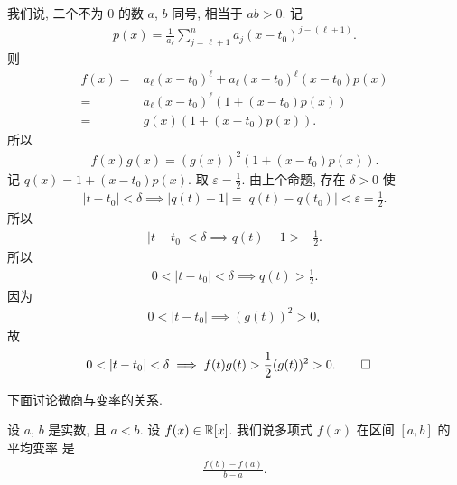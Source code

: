 \begin{pf}
    我们说, 二个不为 $0$ 的数 $a$, $b$ 同号, 相当于 $ab > 0$. 记
    \begin{align*}
        p(x) = \frac{1}{a_\ell} \sum_{j = \ell + 1}^{n} a_j (x - t_0)^{j - (\ell + 1)}.
    \end{align*}
    则
    \begin{align*}
        f(x)
        = {} & a_\ell (x - t_0)^\ell + a_\ell (x - t_0)^{\ell} (x - t_0) p(x) \\
        = {} & a_\ell (x - t_0)^\ell (1 + (x - t_0) p(x))                     \\
        = {} & g(x) (1 + (x - t_0) p(x)).
    \end{align*}
    所以
    \begin{align*}
        f(x) g(x) = (g(x))^2 (1 + (x - t_0) p(x)).
    \end{align*}
    记 $q(x) = 1 + (x - t_0) p(x)$. 取 $\varepsilon = \frac12$. 由上个命题, 存在 $\delta > 0$ 使
    \begin{align*}
        |t - t_0| < \delta \implies |q(t) - 1| = |q(t) - q(t_0)| < \varepsilon = \frac12.
    \end{align*}
    所以
    \begin{align*}
        |t - t_0| < \delta \implies q(t) - 1 > -\frac12.
    \end{align*}
    所以
    \begin{align*}
        0 < |t - t_0| < \delta \implies q(t) > \frac12.
    \end{align*}
    因为
    \begin{align*}
        0 < |t - t_0| \implies (g(t))^2 > 0,
    \end{align*}
    故
    \begin{align*}
         & 0 < |t - t_0| < \delta \implies f(t) g(t) > \frac12 (g(t))^2 > 0. \qedhere
    \end{align*}
\end{pf}

下面讨论微商与变率的关系.

\begin{definition}
    设 $a$, $b$ 是实数, 且 $a < b$. 设 $f(x) \in \mathbb{R}[x]$. 我们说多项式 $f(x)$ 在区间 $[a, b]$ 的平均变率  是
    \begin{align*}
        \frac{f(b) - f(a)}{b - a}.
    \end{align*}
\end{definition}

